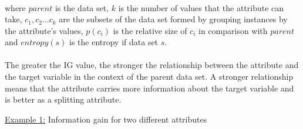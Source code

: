 \begin{itemize}
{\begin{align*}
    \end{align*}
    where $parent$ is the data set, $k$ is the number of values that the attribute can take, $c_1, c_2 ... c_k$ are the subsets of the data set formed by grouping instances by the attribute's values, $p(c_i)$ is the relative size of $c_i$ in comparison with $parent$ and $entropy(s)$ is the entropy if data set $s$. }\\\\
    The greater the IG value, the stronger the relationship between the attribute and the target variable in the context of the parent data set. A stronger relationship means that the attribute carries more information about the target variable and is better as a splitting attribute.
  \end{itemize}
    \newpage
    \underline{Example 1:} Information gain for two different attributes

